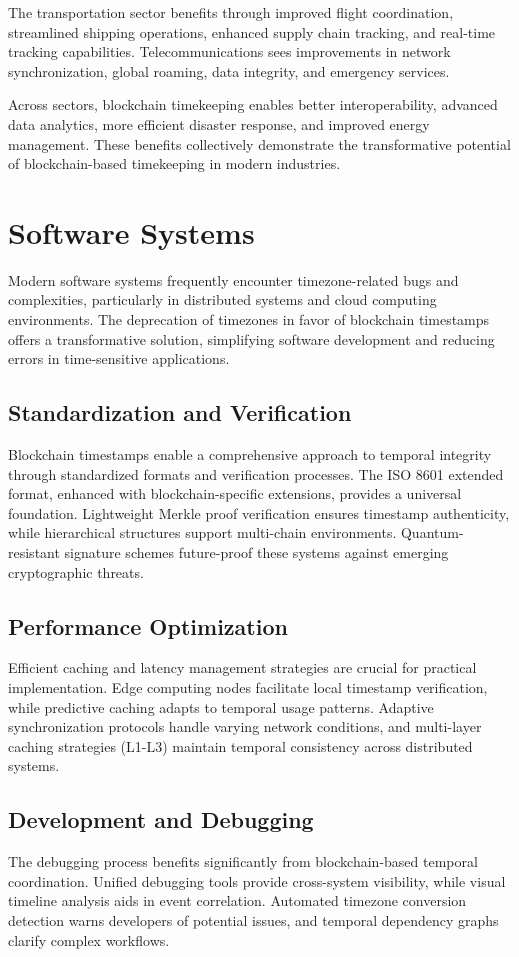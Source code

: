\documentclass[12pt]{report}
\begin{document}
The transportation sector benefits through improved flight coordination, streamlined shipping operations, enhanced supply chain tracking, and real-time tracking capabilities. Telecommunications sees improvements in network synchronization, global roaming, data integrity, and emergency services. 

Across sectors, blockchain timekeeping enables better interoperability, advanced data analytics, more efficient disaster response, and improved energy management. These benefits collectively demonstrate the transformative potential of blockchain-based timekeeping in modern industries.

\section{Software Systems}
Modern software systems frequently encounter timezone-related bugs and complexities, particularly in distributed systems and cloud computing environments. The deprecation of timezones in favor of blockchain timestamps offers a transformative solution, simplifying software development and reducing errors in time-sensitive applications.

\subsection{Standardization and Verification}
Blockchain timestamps enable a comprehensive approach to temporal integrity through standardized formats and verification processes. The ISO 8601 extended format, enhanced with blockchain-specific extensions, provides a universal foundation. Lightweight Merkle proof verification ensures timestamp authenticity, while hierarchical structures support multi-chain environments. Quantum-resistant signature schemes future-proof these systems against emerging cryptographic threats.

\subsection{Performance Optimization}
Efficient caching and latency management strategies are crucial for practical implementation. Edge computing nodes facilitate local timestamp verification, while predictive caching adapts to temporal usage patterns. Adaptive synchronization protocols handle varying network conditions, and multi-layer caching strategies (L1-L3) maintain temporal consistency across distributed systems.

\subsection{Development and Debugging}
The debugging process benefits significantly from blockchain-based temporal coordination. Unified debugging tools provide cross-system visibility, while visual timeline analysis aids in event correlation. Automated timezone conversion detection warns developers of potential issues, and temporal dependency graphs clarify complex workflows.
\end{document}
